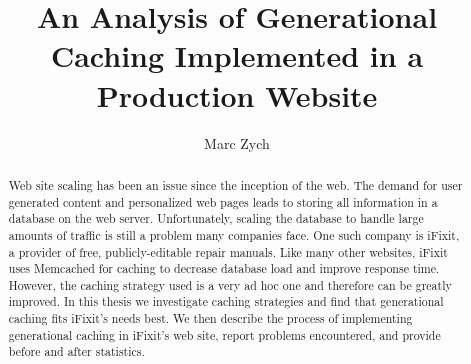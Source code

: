 \documentclass[12pt]{ucthesis}
\begin{document}

\title{An Analysis of Generational Caching Implemented in a Production Website}
\author{Marc Zych}
  
 
     



\maketitle

\begin{frontmatter}

\copyrightpage

\committeemembershippage

\begin{abstract}
Web site scaling has been an issue since the inception of the web.
The demand for user generated content and personalized web pages leads to storing all information in a database on the web server.
Unfortunately, scaling the database to handle large amounts of traffic is still a problem many companies face.
One such company is \textsf{iFixit}, a provider of free, publicly-editable repair manuals.
Like many other websites, \textsf{iFixit} uses \textsf{Memcached} for caching to decrease database load and improve response time.
However, the caching strategy used is a very ad hoc one and therefore can be greatly improved.
In this thesis we investigate caching strategies and find that generational caching fits \textsf{iFixit}'s needs best.
We then describe the process of implementing generational caching in \textsf{iFixit}'s web site, report problems encountered, and provide before and after statistics.
\end{abstract}


\tableofcontents


\listoftables

\listoffigures

\end{frontmatter}

\pagestyle{plain}




\renewcommand{\baselinestretch}{1.66}
\end{document}
